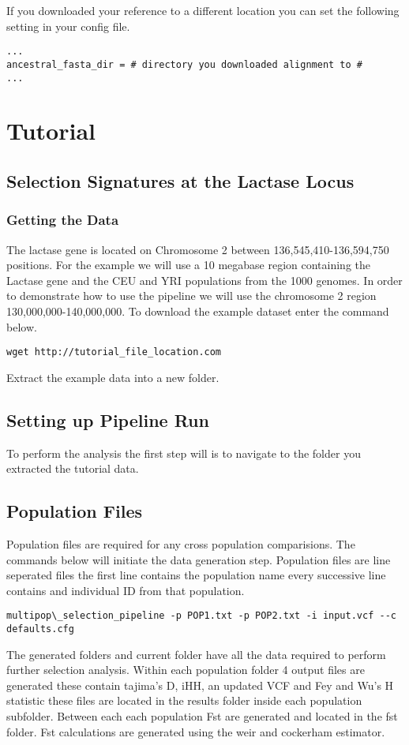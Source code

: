 \documentclass[a4paper,10pt]{article}
\begin{document}
If you downloaded your reference to a different location you can set the following setting in your config file.\\
\begin{verbatim}
...
ancestral_fasta_dir = # directory you downloaded alignment to #
...
\end{verbatim}

\section{Tutorial}
\subsection{Selection Signatures at the Lactase Locus}
\subsubsection{Getting the Data}
The lactase gene is located on Chromosome 2 between 136,545,410-136,594,750 positions. For the example we will use a 10 megabase region containing the Lactase gene and the CEU and YRI populations from the 1000 genomes. In order to demonstrate how to use the pipeline we will use the chromosome 2 region 130,000,000-140,000,000. To download the example dataset enter the command below. \\

\begin{verbatim}
wget http://tutorial_file_location.com 
\end{verbatim}

Extract the example data into a new folder.

\subsection{Setting up Pipeline Run}
To perform the analysis the first step will is to navigate to the folder you extracted the tutorial data.
\subsection{Population Files}
Population files are required for any cross population comparisions. The commands below will initiate the data generation step. Population files are line seperated files the first line contains the population name every successive line contains and individual ID from that population.\\
\begin{verbatim}
multipop\_selection_pipeline -p POP1.txt -p POP2.txt -i input.vcf --c defaults.cfg
\end{verbatim}
The generated folders and current folder have all the data required to perform further selection analysis. Within each population folder 4 output files are generated these contain tajima's D, iHH, an updated VCF and Fey and Wu's H statistic these files are located in the results folder inside each population subfolder. Between each each population Fst are generated and located in the fst folder. Fst calculations are generated using the weir and cockerham estimator.
\end{document}
